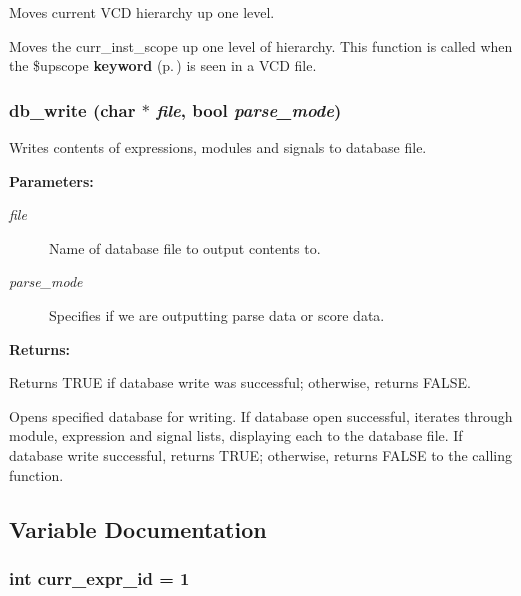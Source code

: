 Moves current VCD hierarchy up one level.

Moves the curr\_\-inst\_\-scope up one level of hierarchy. This function is called when the \$upscope {\bf keyword} {\rm (p.\,\pageref{structkeyword})} is seen in a VCD file. 
\subsubsection{ db\_\-write (char $\ast$ {\em file}, {\bf bool} {\em parse\_\-mode})}\label{db_8c_a17}


Writes contents of expressions, modules and signals to database file.

\begin{Desc}
\item[{\bf Parameters: }]\par
\begin{description}
\item[
{\em file}]Name of database file to output contents to. \item[
{\em parse\_\-mode}]Specifies if we are outputting parse data or score data.

\end{description}
\end{Desc}
\begin{Desc}
\item[{\bf Returns: }]\par
Returns TRUE if database write was successful; otherwise, returns FALSE.

\end{Desc}
Opens specified database for writing. If database open successful, iterates through module, expression and signal lists, displaying each to the database file. If database write successful, returns TRUE; otherwise, returns FALSE to the calling function. 

\subsection{Variable Documentation}
\subsubsection{\setlength{\rightskip}{0pt plus 5cm}int curr\_\-expr\_\-id = 1}\label{db_8c_a15}


